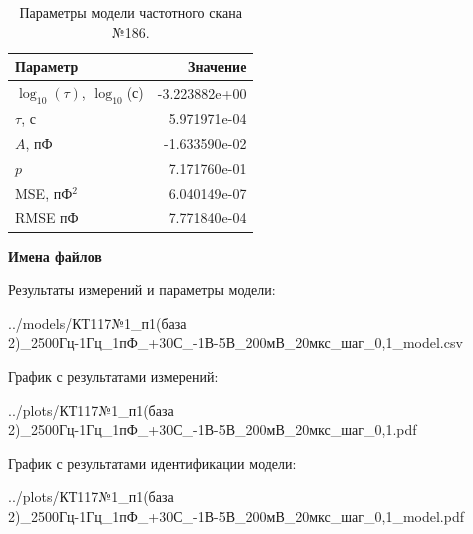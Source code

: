 \begin{table}[!ht]
    \centering
    \caption{Параметры модели частотного скана №186.}
    \begin{tabular}{|l|r|}
        \hline
        Параметр                                       & Значение                  \\ \hline
        $\log_{10}(\tau)$, $\log_{10}$(с)              & -3.223882e+00             \\ \hline
        $\tau$, с                                      & 5.971971e-04              \\ \hline
        $A$, пФ                                        & -1.633590e-02             \\ \hline
        $p$                                            & 7.171760e-01              \\ \hline
        MSE, пФ$^2$                                    & 6.040149e-07              \\ \hline
        RMSE пФ                                        & 7.771840e-04              \\ \hline
    \end{tabular}
    \label{table:frequency_scan_model_186}
\end{table}

\textbf{Имена файлов}

Результаты измерений и параметры модели:

\scriptsize../models/КТ117№1\_п1(база 2)\_2500Гц-1Гц\_1пФ\_+30С\_-1В-5В\_200мВ\_20мкс\_шаг\_0,1\_model.csv
\normalsize

График с результатами измерений:

\scriptsize../plots/КТ117№1\_п1(база 2)\_2500Гц-1Гц\_1пФ\_+30С\_-1В-5В\_200мВ\_20мкс\_шаг\_0,1.pdf
\normalsize

График с результатами идентификации модели:

\scriptsize../plots/КТ117№1\_п1(база 2)\_2500Гц-1Гц\_1пФ\_+30С\_-1В-5В\_200мВ\_20мкс\_шаг\_0,1\_model.pdf
\normalsize

